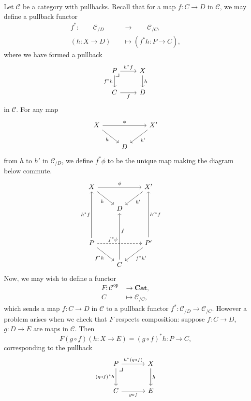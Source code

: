\documentclass{MetricNotes2023}
\begin{document}
Let \(\mathcal{C}\) be a category with pullbacks. Recall that for a map \(f : C \to D\) in \(\mathcal{C}\), we may define a pullback functor 
\begin{align*}
f^* : \qquad\mathcal{C}_{/D}\qquad&\to\qquad \mathcal{C}_{/C},\\
(h : X \to D) &\mapsto (f^*h : P \to C),
\end{align*}
 where we have formed a pullback 
\[\begin{tikzcd}
P \arrow[r, "h^*f"] \arrow[d, swap, "f^*h"] \arrow[dr, phantom, "\scalebox{1.3}{$\lrcorner$}" {xshift=-16pt, yshift=10pt}] & X \arrow[d, "h"]  \\
C \arrow[r, swap, "f"]  & D
\end{tikzcd}\]
in \(\mathcal{C}\). For any map 
\[\begin{tikzcd}
X \arrow[rr, "\phi"] \arrow[dr, swap, "h"]  & & X' \arrow[dl, "h'"]  \\
& D  & 
\end{tikzcd}\]
from \(h\) to \(h'\) in \(\mathcal{C}_{/D}\), we define \(f^*\phi\) to be the unique map making the diagram below commute.
\[\begin{tikzcd}
X \arrow[rr, "\phi"] \arrow[dr, swap, "h"]  & & X' \arrow[dl, "h'"]  \\
& D  & \\
& & & \\
P \arrow[rr, dashrightarrow, "f^*\phi" {xshift=-10pt}] \arrow[uuu, "h^*f"] \arrow[dr, swap, "f^*h"] & & P' \arrow[uuu, swap, "h'^*f"] \arrow[dl, "f^*h'"]\\
& C \arrow[uuu, swap, "f" {yshift=8pt}] & 
\end{tikzcd}\]
Now, we may wish to define a functor 
\begin{align*}
F : \mathcal{C}^{\text{op}} &\to \textbf{Cat},\\
C &\mapsto \mathcal{C}_{/C},
\end{align*}
which sends a map \(f : C \to D\) in \(\mathcal{C}\) to a pullback functor \(f^* : \mathcal{C}_{/D}\to \mathcal{C}_{/C}\). However a problem arises when we check that \(F\) respects composition: suppose \(f : C \to D\), \(g : D \to E\) are maps in \(\mathcal{C}\). Then 
\[F(g \circ f)(h : X \to E)=(g\circ f)^*h : P \to C,\] corresponding to the pullback
\[\begin{tikzcd}[column sep=8ex, row sep=6ex]
P \arrow[r, "h^*(g\circ f)"] \arrow[d, swap, "(g \circ f)^*h"] \arrow[dr, phantom, "\scalebox{1.3}{$\lrcorner$}" {xshift=-18pt, yshift=12pt}] & X \arrow[d, "h"]  \\
C \arrow[r, swap, "g\circ f"]  & E
\end{tikzcd}\]
\end{document}
